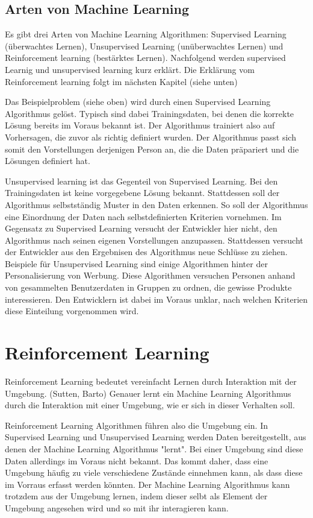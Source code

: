 \subsection*{Arten von Machine Learning}

Es gibt drei Arten von Machine Learning Algorithmen: Supervised Learning (überwachtes Lernen), Unsupervised Learning (unüberwachtes Lernen) und
Reinforcement learning (bestärktes Lernen). Nachfolgend werden supervised Learnig und unsupervised learning
kurz erklärt. Die Erklärung vom Reinforcement learning folgt im nächsten Kapitel (siehe unten)

Das Beispielproblem (siehe oben) wird durch einen Supervised Learning
Algorithmus gelöst. Typisch sind dabei Trainingsdaten, bei denen die korrekte
Lösung bereits im Voraus bekannt ist. Der Algorithmus trainiert also auf
Vorhersagen, die zuvor als richtig definiert wurden. Der Algorithmus passt sich
somit den Vorstellungen derjenigen Person an, die die Daten präpariert und die
Lösungen definiert hat.


Unsupervised learning ist das Gegenteil von Supervised Learning. Bei den
Trainingsdaten ist keine vorgegebene Lösung bekannt. Stattdessen soll der
Algorithmus selbstständig Muster in den Daten erkennen. So soll der Algorithmus
eine Einordnung der Daten nach selbstdefinierten Kriterien vornehmen. Im
Gegensatz zu Supervised Learning versucht der Entwickler hier nicht, den
Algorithmus nach seinen eigenen Vorstellungen anzupassen. Stattdessen versucht
der Entwickler aus den Ergebnisen des Algorithmus neue Schlüsse zu ziehen.
Beispiele für Unsupervised Learning sind einige Algorithmen hinter der
Personalisierung von Werbung. Diese Algorithmen versuchen Personen anhand von
gesammelten Benutzerdaten in Gruppen zu ordnen, die gewisse Produkte
interessieren. Den Entwicklern ist dabei im Voraus unklar, nach welchen
Kriterien diese Einteilung vorgenommen wird. 

\section{Reinforcement Learning}
\label{chap:t_rl}

Reinforcement Learning bedeutet vereinfacht Lernen durch Interaktion mit der
Umgebung. (Sutten, Barto)  Genauer lernt ein Machine Learning Algorithmus durch
die Interaktion mit einer Umgebung, wie er sich in dieser Verhalten soll.

Reinforcement Learning Algorithmen führen also die Umgebung ein. In Supervised
Learning und Unsupervised Learning werden Daten bereitgestellt, aus denen der
Machine Learning Algorithmus "lernt". Bei einer Umgebung sind diese Daten
allerdings im Voraus nicht bekannt. Das kommt daher, dass eine Umgebung häufig
zu viele verschiedene Zustände einnehmen kann, als dass diese im Vorraus erfasst
werden könnten. Der Machine Learning Algorithmus kann trotzdem aus der Umgebung
lernen, indem dieser selbt als Element der Umgebung angesehen wird und so mit
ihr interagieren kann.

